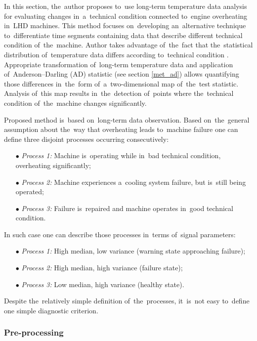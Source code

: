 In this section, the~author proposes to~use long-term temperature data analysis for evaluating changes in~a~technical condition connected to~engine overheating in~LHD machines. This method focuses on~developing an~alternative technique to~differentiate time segments containing data that describe different technical condition of~the~machine. Author takes advantage of~the~fact that the~statistical distribution of~temperature data differs according to~technical condition \cite{wodecki2016condition}. Appropriate transformation of~long-term temperature data and application of~Anderson–Darling (AD) statistic (see section \ref{met_ad}) allows quantifying those differences in~the~form of~a~two-dimensional map of~the~test statistic. Analysis of~this map results in~the~detection of~points where the~technical condition of~the~machine changes significantly.

Proposed method is~based on~long-term data observation. Based on~the~general assumption about the~way that overheating leads to~machine failure one can define three disjoint processes occurring consecutively:

\begin{itemize}
  \item[$\bullet$] \emph{Process 1:} Machine is~operating while in~bad technical condition, overheating significantly;
  \item[$\bullet$] \emph{Process 2:} Machine experiences a~cooling system failure, but is~still being operated;
  \item[$\bullet$] \emph{Process 3:} Failure is~repaired and machine operates in~good technical condition.
\end{itemize}

In such case one can describe those processes in~terms of~signal parameters:

\begin{itemize}
  \item[$\bullet$] \emph{Process 1:} High median, low variance (warning state approaching failure);
  \item[$\bullet$] \emph{Process 2:} High median, high variance (failure state);
  \item[$\bullet$] \emph{Process 3:} Low median, high variance (healthy state).
\end{itemize}

Despite the~relatively simple definition of~the~processes, it~is~not easy to~define one simple diagnostic criterion.

\subsubsection{Pre-processing}

